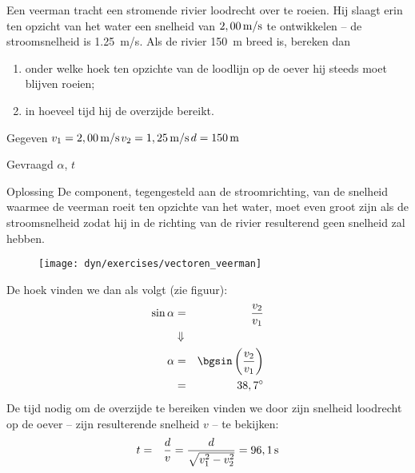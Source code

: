 
\begin{exercise}




 Een veerman tracht een stromende rivier loodrecht over te roeien. Hij slaagt erin ten opzicht van het water een snelheid van $2,00\rm\,m/s$ te ontwikkelen -- de stroomsnelheid is \SI{1,25}{m/s}. Als de rivier \SI{150}{m} breed is, bereken dan
\begin{enumerate}
\item onder welke hoek ten opzichte van de loodlijn op de oever hij steeds moet blijven roeien;
\item in hoeveel tijd hij de overzijde bereikt.
\end{enumerate}
\begin{oplossing}
\item[Gegeven]$v_1=2,00\rm\,m/s$\newline$v_2=1,25\rm\,m/s$\newline$d=150\rm\,m$
\item[Gevraagd]$\alpha$, $t$
\item[Oplossing]De component, tegengesteld aan de stroomrichting, van de snelheid waarmee de veerman roeit ten opzichte van het water, moet even groot zijn als de stroomsnelheid zodat hij in de richting van de rivier resulterend
geen snelheid zal hebben. 
\begin{figure}[h]
\centering
\texttt{[image: dyn/exercises/vectoren\_veerman]}
\end{figure}
\newline
De hoek vinden we dan als volgt (zie figuur):
\begin{eqnarray*}
\sin{\alpha}&=&\frac{v_2}{v_1}\\
&\Downarrow&\\
\alpha&=&\bgsin\left(\frac{v_2}{v_1}\right)\\
&=&38,7^\circ
\end{eqnarray*}
De tijd nodig om de overzijde te bereiken vinden we door zijn snelheid loodrecht op de oever -- zijn resulterende snelheid $v$ -- te bekijken:
\begin{eqnarray*}
t&=&\frac{d}{v}=\frac{d}{\sqrt{v_1^2-v_2^2}}=96,1{\rm\,s}
\end{eqnarray*}
\end{oplossing}

\end{exercise}
